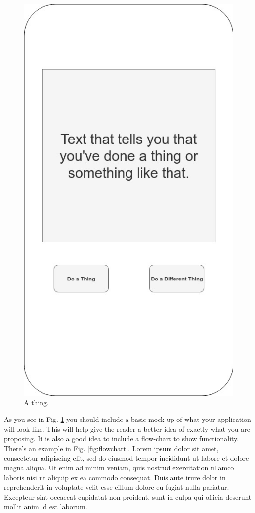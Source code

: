 \documentclass[12pt]{extarticle}
\begin{document}
\begin{figure}[!ht]
\centering
  \includegraphics[width={0.2\linewidth}]{img/thing.jpg}
  \caption{A thing.}
  \label{fig:thing1}
\end{figure}

As you see in Fig. \ref{fig:thing1} you should include a basic mock-up of what your application will look like. This will help give the reader a better idea of exactly what you are proposing. It is also a good idea to include a flow-chart to show functionality. There's an example in Fig. \ref{fig:flowchart}. Lorem ipsum dolor sit amet, consectetur adipiscing elit, sed do eiusmod tempor incididunt ut labore et dolore magna aliqua. Ut enim ad minim veniam, quis nostrud exercitation ullamco laboris nisi ut aliquip ex ea commodo consequat. Duis aute irure dolor in reprehenderit in voluptate velit esse cillum dolore eu fugiat nulla pariatur. Excepteur sint occaecat cupidatat non proident, sunt in culpa qui officia deserunt mollit anim id est laborum.
\end{document}
